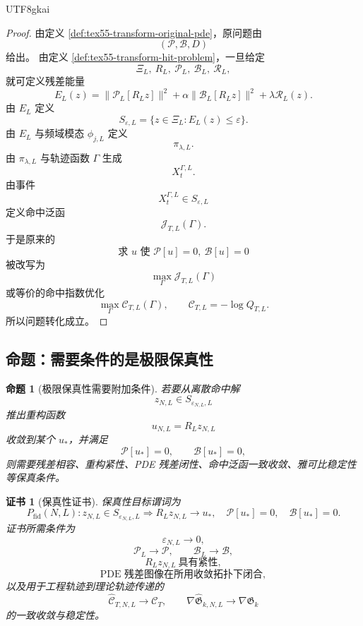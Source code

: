 \documentclass[12pt]{article}
\newtheorem{proposition}{命题}[section]
\newtheorem{Certificate}{证书}[section]
\begin{document}
\begin{CJK*}{UTF8}{gkai}
\begin{proof}
由定义 \ref{def:tex55-transform-original-pde}，原问题由
\[
  (\mathcal P,\mathcal B,D)
\]
给出。
由定义 \ref{def:tex55-transform-hit-problem}，一旦给定
\[
  \Xi_L,\ R_L,\ \mathcal P_L,\ \mathcal B_L,\ \mathcal R_L,
\]
就可定义残差能量
\[
  E_L(z)
  =
  \lVert \mathcal P_L[R_Lz]\rVert^2
  +\alpha\lVert \mathcal B_L[R_Lz]\rVert^2
  +\lambda\mathcal R_L(z).
\]
由 \(E_L\) 定义
\[
  S_{\varepsilon,L}
  =
  \{z\in\Xi_L:E_L(z)\le\varepsilon\}.
\]
由 \(E_L\) 与频域模态 \(\phi_{j,L}\) 定义
\[
  \pi_{\lambda,L}.
\]
由 \(\pi_{\lambda,L}\) 与轨迹函数 \(\Gamma\) 生成
\[
  X_t^{\Gamma,L}.
\]
由事件
\[
  X_t^{\Gamma,L}\in S_{\varepsilon,L}
\]
定义命中泛函
\[
  \mathcal J_{T,L}(\Gamma).
\]
于是原来的
\[
  \text{求 }u\text{ 使 }\mathcal P[u]=0,\ \mathcal B[u]=0
\]
被改写为
\[
  \max_{\Gamma}\mathcal J_{T,L}(\Gamma)
\]
或等价的命中指数优化
\[
  \max_{\Gamma}\mathcal C_{T,L}(\Gamma),
  \qquad
  \mathcal C_{T,L}=-\log Q_{T,L}.
\]
所以问题转化成立。
\end{proof}

\subsection{命题：需要条件的是极限保真性}
\label{subsec:tex55-fidelity-needs-conditions}

\begin{proposition}[极限保真性需要附加条件]
\label{prop:tex55-fidelity-needs-conditions}
若要从离散命中解
\[
  z_{N,L}\in S_{\varepsilon_{N,L},L}
\]
推出重构函数
\[
  u_{N,L}=R_Lz_{N,L}
\]
收敛到某个 \(u_*\)，并满足
\[
  \mathcal P[u_*]=0,
  \qquad
  \mathcal B[u_*]=0,
\]
则需要残差相容、重构紧性、PDE 残差闭性、命中泛函一致收敛、雅可比稳定性等保真条件。
\end{proposition}

\begin{Certificate}[保真性证书]
\label{cert:tex55-fidelity-needs-conditions}
保真性目标谓词为
\[
  P_{\mathrm{fid}}(N,L):
  z_{N,L}\in S_{\varepsilon_{N,L},L}
  \Longrightarrow
  R_Lz_{N,L}\to u_*,
  \quad
  \mathcal P[u_*]=0,
  \quad
  \mathcal B[u_*]=0.
\]
证书所需条件为
\[
  \varepsilon_{N,L}\to0,
\]
\[
  \mathcal P_L\to\mathcal P,
  \qquad
  \mathcal B_L\to\mathcal B,
\]
\[
  R_Lz_{N,L}\ \text{具有紧性},
\]
\[
  \text{PDE 残差图像在所用收敛拓扑下闭合},
\]
以及用于工程轨迹到理论轨迹传递的
\[
  \widehat{\mathcal C}_{T,N,L}\to\mathcal C_T,
  \qquad
  \nabla\widehat{\mathfrak G}_{k,N,L}\to\nabla\mathfrak G_k
\]
的一致收敛与稳定性。
\end{Certificate}


\end{CJK*}
\end{document}

